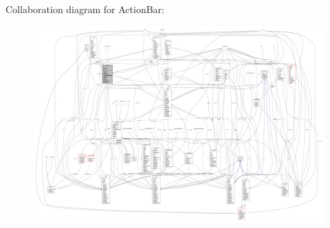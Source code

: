 Collaboration diagram for Action\+Bar\+:
\nopagebreak
\begin{figure}[H]
\begin{center}
\leavevmode
\includegraphics[width=350pt]{classui_1_1_action_bar__coll__graph}
\end{center}
\end{figure}
